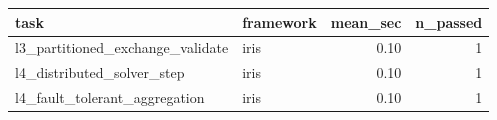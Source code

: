 \begin{tabular}{llrr}
\hline
task & framework & mean\_sec & n\_passed \\
\hline
l3_partitioned_exchange_validate & iris & 0.10 & 1 \\
l4_distributed_solver_step & iris & 0.10 & 1 \\
l4_fault_tolerant_aggregation & iris & 0.10 & 1 \\
\hline
\end{tabular}
